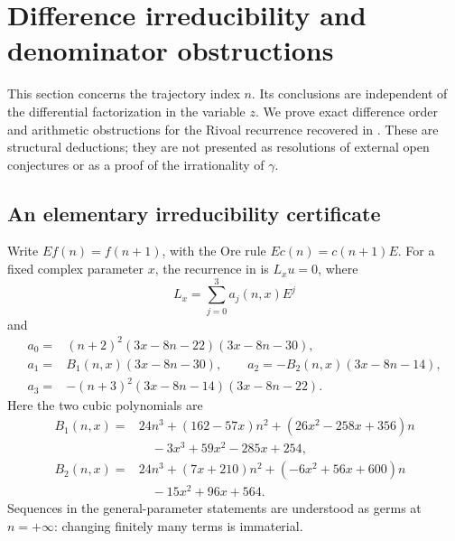 \documentclass[11pt,a4paper]{article}
\theoremstyle{definition}
\theoremstyle{remark}
\numberwithin{equation}{section}
\begin{document}
\section{Difference irreducibility and denominator obstructions}
\label{p3:sec:gamma-arithmetic}

This section concerns the trajectory index $n$. Its conclusions are
independent of the differential factorization in the variable $z$.
We prove exact difference order and arithmetic obstructions for the
Rivoal recurrence recovered in \cite[\S8.4]{p3:KMLWSK26}. These are structural
deductions; they are not presented as resolutions of external open
conjectures or as a proof of the irrationality of $\gamma$.

\subsection{An elementary irreducibility certificate}

Write $Ef(n)=f(n+1)$, with the Ore rule $E c(n)=c(n+1)E$.
For a fixed complex parameter $x$, the recurrence in
\cite[(1.3)]{p3:Riv09} is $L_xu=0$, where
\begin{equation}\label{p3:eq:ga-L}
 L_x=\sum_{j=0}^3 a_j(n,x)E^j
\end{equation}
and
\begin{align*}
 a_0={}&(n+2)^2(3x-8n-22)(3x-8n-30),\\
 a_1={}&B_1(n,x)(3x-8n-30),\qquad
 a_2=-B_2(n,x)(3x-8n-14),\\
 a_3={}&-(n+3)^2(3x-8n-14)(3x-8n-22).
\end{align*}
Here the two cubic polynomials are
\begin{align*}
 B_1(n,x)={}&24n^3+(162-57x)n^2+(26x^2-258x+356)n\\
            &\quad-3x^3+59x^2-285x+254,\\
 B_2(n,x)={}&24n^3+(7x+210)n^2+(-6x^2+56x+600)n\\
            &\quad-15x^2+96x+564.
\end{align*}
Sequences in the general-parameter statements are understood as germs
at $n=+\infty$: changing finitely many terms is immaterial.
\end{document}
